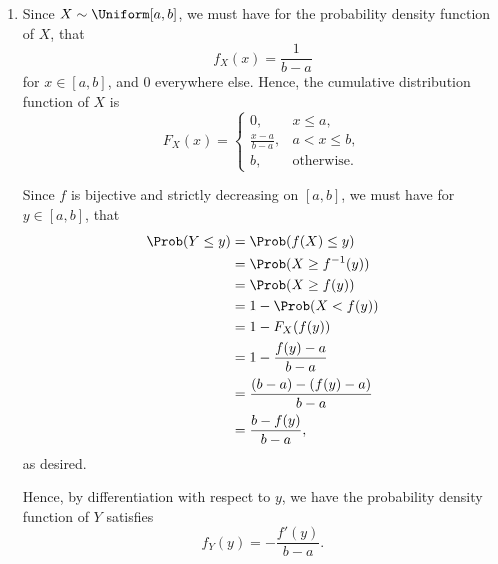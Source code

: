 \Question{\currfilebase}
\begin{enumerate}
    \item Since \(X \sim \Uniform[a, b]\), we must have for the probability density function of \(X\), that
          \[
              f_{X}(x) = \frac{1}{b - a}
          \]
          for \(x \in [a, b]\), and \(0\) everywhere else. Hence, the cumulative distribution function of \(X\) is
          \[
              F_{X}(x) = \begin{cases}
                  0,                   & x \leq a,         \\
                  \frac{x - a}{b - a}, & a < x \leq b,     \\
                  b,                   & \text{otherwise}.
              \end{cases}
          \]

          Since \(f\) is bijective and strictly decreasing on \([a, b]\), we must have for \(y \in [a, b]\), that
          \begin{align*}
              \Prob(Y \leq y) & = \Prob(f(X) \leq y)                 \\
                              & = \Prob(X \geq f^{-1}(y))            \\
                              & = \Prob(X \geq f(y))                 \\
                              & = 1 - \Prob(X < f(y))                \\
                              & = 1 - F_{X} (f(y))                   \\
                              & = 1 - \frac{f(y) - a}{b - a}         \\
                              & = \frac{(b - a) - (f(y) - a)}{b - a} \\
                              & = \frac{b - f(y)}{b - a},
          \end{align*}
          as desired.

          Hence, by differentiation with respect to \(y\), we have the probability density function of \(Y\) satisfies
          \[
              f_{Y}(y) = - \frac{f'(y)}{b - a}.
          \]


\end{enumerate}
